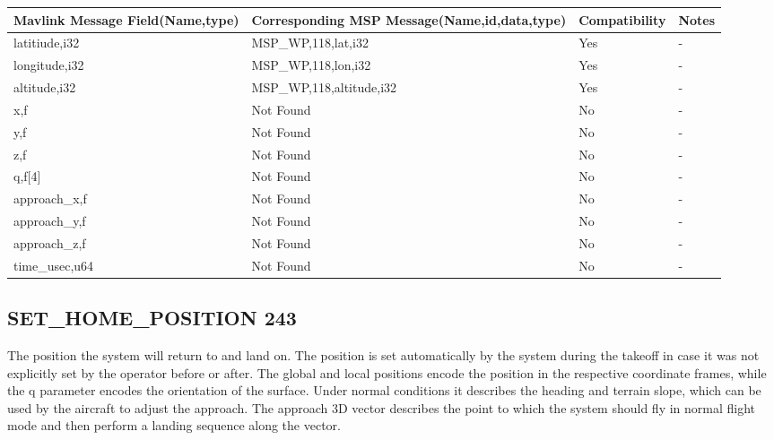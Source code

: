 {
\centering
\begin{tabular}{ |p{4cm  } |p{7cm} | p{2cm}|m{5em}|}
\hline
Mavlink Message Field(Name,type)&Corresponding MSP Message(Name,id,data,type)& Compatibility & Notes\\
\hline
\rowcolor{green}
latitiude,i32 & MSP\_WP,118,lat,i32& Yes & - \\
\hline
\rowcolor{green}
longitude,i32 & MSP\_WP,118,lon,i32 & Yes & - \\
\hline
\rowcolor{green}
altitude,i32 & MSP\_WP,118,altitude,i32 & Yes & - \\
\hline
x,f& Not Found & No & - \\
\hline
y,f& Not Found & No & - \\
\hline
z,f & Not Found & No & - \\
\hline
q,f[4] & Not Found & No & - \\
\hline
approach\_x,f & Not Found & No & - \\
\hline
approach\_y,f & Not Found & No & - \\
\hline
approach\_z,f & Not Found & No & - \\
\hline
time\_usec,u64 & Not Found & No & - \\
\end{tabular}
}

\cleardoublepage


\subsection{SET\_HOME\_POSITION 243 } 
The position the system will return to and land on. The position is set automatically by the system during the takeoff in case it was not explicitly set by the operator before or after. The global and local positions encode the position in the respective coordinate frames, while the q parameter encodes the orientation of the surface. Under normal conditions it describes the heading and terrain slope, which can be used by the aircraft to adjust the approach. The approach 3D vector describes the point to which the system should fly in normal flight mode and then perform a landing sequence along the vector.\\

